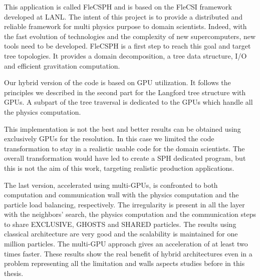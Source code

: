 This application is called FleCSPH and is based on the FleCSI framework developed at LANL. 
The intent of this project is to provide a distributed and reliable framework for multi physics purpose to domain scientists.
Indeed, with the fast evolution of technologies and the complexity of new supercomputers, new tools need to be developed. 
FleCSPH is a first step to reach this goal and target tree topologies. 
It provides a domain decomposition, a tree data structure, I/O and efficient gravitation computation.

Our hybrid version of the code is based on GPU utilization. 
It follows the principles we described in the second part for the Langford tree structure with GPUs. 
A subpart of the tree traversal is dedicated to the GPUs which handle all the physics computation.  

This implementation is not the best and better results can be obtained using exclusively GPUs for the resolution. 
In this case we limited the code transformation to stay in a realistic usable code for the domain scientists. 
The overall transformation would have led to create a SPH dedicated program, but this is not the aim of this work, targeting realistic production applications. 

The last version, accelerated using multi-GPUs, is confronted to both computation and communication wall with the physics computation and the particle load balancing, respectively. 
The irregularity is present in all the layer with the neighbors’ search, the physics computation and the communication steps to share EXCLUSIVE, GHOSTS and SHARED particles. 
The results using classical architecture are very good and the scalability is maintained for one million particles. 
The multi-GPU approach gives an acceleration of at least two times faster. 
These results show the real benefit of hybrid architectures even in a problem representing all the limitation and walls aspects studies before in this thesis.
